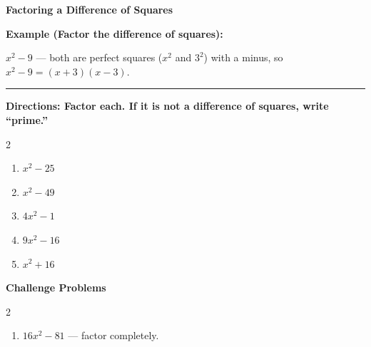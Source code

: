 \documentclass[12pt]{article}
\begin{document}
\vspace{0.35cm}

\begin{center}{\Large \textbf{Factoring a Difference of Squares}}\end{center}\vspace{0.25cm}
\textbf{Example (Factor the difference of squares):}

$x^{2}-9$ — both are perfect squares ($x^2$ and $3^2$) with a minus, so $x^{2}-9=(x+3)(x-3)$.

\vspace{0.3cm}\hrule\vspace{0.4cm}
\textbf{Directions: Factor each. If it is not a difference of squares, write “prime.”}

\begin{multicols}{2}
\begin{enumerate}[label=\textbf{\arabic*.}, start=1, itemsep=2cm]
  \item $\displaystyle x^{2}-25$
  \item $\displaystyle x^{2}-49$
  \item $\displaystyle 4x^{2}-1$
  \item $\displaystyle 9x^{2}-16$
  \item $\displaystyle x^{2}+16$
\end{enumerate}
\end{multicols}
\newpage

\begin{center}{\large \textbf{Challenge Problems}}\end{center}\vspace{0.3cm}
\begin{multicols}{2}\begin{enumerate}[label=\textbf{\arabic*.}, start=6, itemsep=2.6cm]
  \item $16x^{2}-81$ — factor completely.
\end{enumerate}\end{multicols}\newpage
\end{document}
